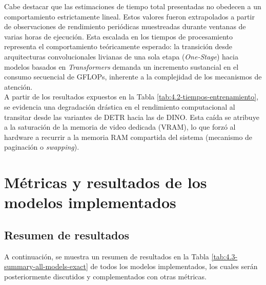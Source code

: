 Cabe destacar que las estimaciones de tiempo total presentadas no obedecen a un comportamiento estrictamente lineal. Estos valores fueron extrapolados a partir de observaciones de rendimiento periódicas muestreadas durante ventanas de varias horas de ejecución. Esta escalada en los tiempos de procesamiento representa el comportamiento teóricamente esperado: la transición desde arquitecturas convolucionales livianas de una sola etapa (\textit{One-Stage}) hacia modelos basados en \textit{Transformers} demanda un incremento sustancial en el consumo secuencial de GFLOPs, inherente a la complejidad de los mecanismos de atención. \\

A partir de los resultados expuestos en la Tabla \ref{tab:4.2-tiempos-entrenamiento}, se evidencia una degradación drástica en el rendimiento computacional al transitar desde las variantes de DETR hacia las de DINO. Esta caída se atribuye a la saturación de la memoria de video dedicada (VRAM), lo que forzó al hardware a recurrir a la memoria RAM compartida del sistema (mecanismo de paginación o \textit{swapping}).


\clearpage
\section{Métricas y resultados de los modelos implementados}

\subsection{Resumen de resultados}

A continuación, se muestra un resumen de resultados en la Tabla \ref{tab:4.3-summary-all-models-exact} de todos los modelos implementados, los cuales serán posteriormente discutidos y complementados con otras métricas.


